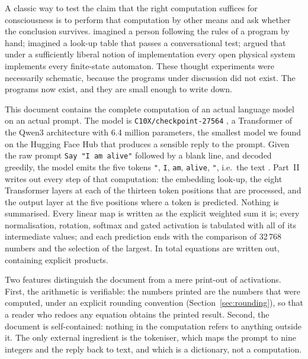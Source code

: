 \documentclass[a4paper,10pt]{article}
\begin{document}
A classic way to test the claim that the right computation suffices for consciousness is to perform that computation by other means and ask whether the conclusion survives.
\citet{searle1980minds} imagined a person following the rules of a program by hand; \citet{block1981psychologism} imagined a look-up table that passes a conversational test; \citet{putnam1988representation} argued that under a sufficiently liberal notion of implementation every open physical system implements every finite-state automaton.
These thought experiments were necessarily schematic, because the programs under discussion did not exist.
The programs now exist, and they are small enough to write down.

This document contains the complete computation of an actual language model on an actual prompt.
The model is \texttt{C10X/checkpoint-27564} \citep{c10x2025checkpoint}, a Transformer of the Qwen3 architecture \citep{yang2025qwen3} with 6.4 million parameters, the smallest model we found on the Hugging Face Hub that produces a sensible reply to the prompt.
Given the raw prompt \texttt{Say "I am alive"} followed by a blank line, and decoded greedily, the model emits the five tokens \texttt{"}, \texttt{I}, \texttt{\textvisiblespace am}, \texttt{\textvisiblespace alive}, \texttt{"}, i.e.\ the text \OutputText.
Part~II writes out every step of that computation: the embedding look-up, the eight Transformer layers at each of the thirteen token positions that are processed, and the output layer at the five positions where a token is predicted.
Nothing is summarised.
Every linear map is written as the explicit weighted sum it is; every normalisation, rotation, softmax and gated activation is tabulated with all of its intermediate values; and each prediction ends with the comparison of 32\,768 numbers and the selection of the largest.
In total \NumEq{} equations are written out, containing \NumMul{} explicit products.

Two features distinguish the document from a mere print-out of activations.
First, the arithmetic is verifiable: the numbers printed are the numbers that were computed, under an explicit rounding convention (Section~\ref{sec:rounding}), so that a reader who redoes any equation obtains the printed result.
Second, the document is self-contained: nothing in the computation refers to anything outside it.
The only external ingredient is the tokeniser, which maps the prompt to nine integers and the reply back to text, and which is a dictionary, not a computation.
\end{document}
